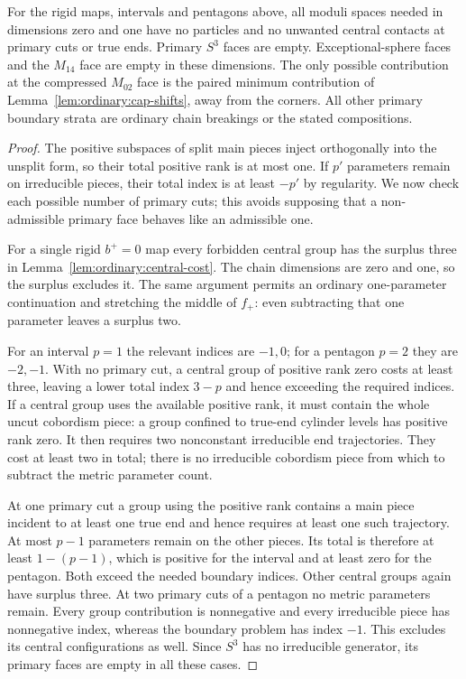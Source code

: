 \begin{lemma}
\label{lem:ordinary:low-dimensional-compactness}
For the rigid maps, intervals and pentagons above, all moduli spaces
needed in dimensions zero and one have no particles and no unwanted
central contacts at primary cuts or true ends.  Primary $S^3$ faces
are empty.  Exceptional-sphere faces and the $M_{14}$ face are empty
in these dimensions.  The only possible contribution at the
compressed $M_{02}$ face is the paired minimum contribution of
Lemma~\ref{lem:ordinary:cap-shifts}, away from the corners.
All other primary boundary strata are ordinary chain breakings or
the stated compositions.
\end{lemma}
\begin{proof}
The positive subspaces of split main pieces inject orthogonally
into the unsplit form, so their total positive rank is at most
one.  If $p'$ parameters remain on irreducible pieces, their
total index is at least $-p'$ by regularity.  We now check each
possible number of primary cuts; this avoids supposing that
a non-admissible primary face behaves like an admissible one.

For a single rigid $b^+=0$ map every forbidden central group
has the surplus three in
Lemma~\ref{lem:ordinary:central-cost}.  The chain dimensions
are zero and one, so the surplus excludes it.  The same
argument permits an ordinary one-parameter continuation and
stretching the middle of $f_+$: even subtracting that one
parameter leaves a surplus two.

For an interval $p=1$ the relevant indices are $-1,0$; for
a pentagon $p=2$ they are $-2,-1$.  With no primary cut,
a central group of positive rank zero costs at least three,
leaving a lower total index $3-p$ and hence exceeding the
required indices.  If a central group uses the available
positive rank, it must contain the whole uncut cobordism
piece: a group confined to true-end cylinder levels has
positive rank zero.  It then requires two nonconstant
irreducible end trajectories.  They cost at least two in
total; there is no irreducible cobordism piece from which
to subtract the metric parameter count.

At one primary cut a group using the positive rank contains
a main piece incident to at least one true end and hence
requires at least one such trajectory.  At most $p-1$
parameters remain on the other pieces.  Its total is
therefore at least $1-(p-1)$, which is positive for the
interval and at least zero for the pentagon.  Both exceed
the needed boundary indices.  Other central groups again
have surplus three.  At two primary cuts of a pentagon
no metric parameters remain.  Every group contribution is
nonnegative and every irreducible piece has nonnegative
index, whereas the boundary problem has index $-1$.
This excludes its central configurations as well.  Since
$S^3$ has no irreducible generator, its primary faces are
empty in all these cases.


\end{proof}
